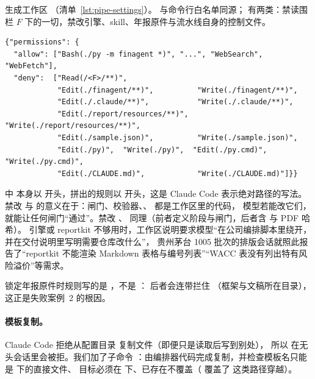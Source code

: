  生成工作区 （清单~\ref{lst:pipe-settings}）。
 与命令行白名单同源； 有两类：禁读围栏 $F$ 下的一切，禁改引擎、skill、年报原件与流水线自身的控制文件。

\begin{lstlisting}[caption={工作区权限（\code{settings()} 的输出结构，\texttt{<F>} 为仓库父目录的绝对路径）},label={lst:pipe-settings}]
{"permissions": {
  "allow": ["Bash(./py -m finagent *)", "...", "WebSearch", "WebFetch"],
  "deny":  ["Read(/<F>/**)",
            "Edit(./finagent/**)",          "Write(./finagent/**)",
            "Edit(./.claude/**)",           "Write(./.claude/**)",
            "Edit(./report/resources/**)",  "Write(./report/resources/**)",
            "Edit(./sample.json)",          "Write(./sample.json)",
            "Edit(./py)",  "Write(./py)",  "Edit(./py.cmd)",  "Write(./py.cmd)",
            "Edit(./CLAUDE.md)",            "Write(./CLAUDE.md)"]}}
\end{lstlisting}

 中  本身以 \code{/} 开头，拼出的规则以 \code{//} 开头，这是 Claude Code 表示绝对路径的写法。
禁改  与  的意义在于：闸门、校验器、、 都是工作区里的代码，
模型若能改它们，就能让任何闸门“通过”。禁改 、 同理（前者定义阶段与闸门，后者含  与 PDF 哈希）。
引擎或 reportkit 不够用时，工作区说明要求模型“在公司编排脚本里绕开，并在交付说明里写明需要仓库改什么”，
贵州茅台 1005 批次的排版会话就照此报告了“reportkit 不能渲染 Markdown 表格与编号列表”“WACC 表没有列出特有风险溢价”等需求。

锁定年报原件时规则写的是 ，不是 ：
后者会连带拦住 （框架与文稿所在目录），这正是失败案例~2 的根因。

\paragraph{模板复制。}Claude Code 拒绝从配置目录  复制文件（即便只是读取后写到别处），
所以  在无头会话里会被拒。我们加了子命令
：由编排器代码完成复制，并检查模板名只能是  下的直接文件、
目标必须在  下、已存在不覆盖（ 覆盖了  这类路径穿越）。

